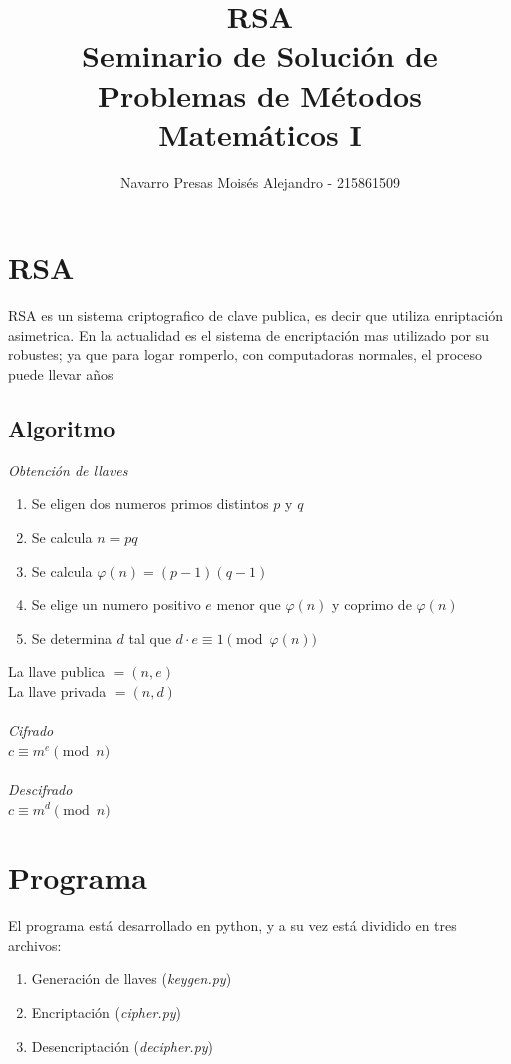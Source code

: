 \documentclass{article}
\author{Navarro Presas Moisés Alejandro - 215861509}
\title{
RSA\\
Seminario de Solución de Problemas de Métodos Matemáticos I
}
\begin{document}
  \maketitle
  \tableofcontents
  \newpage

  \section{RSA}
  RSA es un sistema criptografico de clave publica, es decir que utiliza enriptación asimetrica. En la actualidad es el sistema de encriptación mas utilizado por su robustes; ya que para logar romperlo, con computadoras normales, el proceso puede llevar años

  \subsection{Algoritmo}
  \emph{Obtención de llaves}\\
  \begin{enumerate}
    \item Se eligen dos numeros primos distintos $p$ y $q$
    \item Se calcula $n = pq$
    \item Se calcula $\varphi(n) = (p-1)(q - 1)$
    \item Se elige un numero positivo $e$ menor que $\varphi(n)$ y coprimo de $\varphi(n)$
    \item Se determina $d$ tal que  $d \cdot e \equiv 1 \pmod{\varphi(n)}$
  \end{enumerate}
  La llave publica $=(n, e)$\\
  La llave privada $=(n, d)$\\
  \\
  \emph{Cifrado}\\
  $c \equiv m^e \pmod{n}$\\
  \\
  \emph{Descifrado}\\
  $c \equiv m^d \pmod{n}$\\

  \section{Programa}
  El programa está desarrollado en python, y a su vez está dividido en tres archivos:
  \begin{enumerate}
    \item Generación de llaves (\emph{keygen.py})
    \item Encriptación (\emph{cipher.py})
    \item Desencriptación (\emph{decipher.py})
  \end{enumerate}
\end{document}
